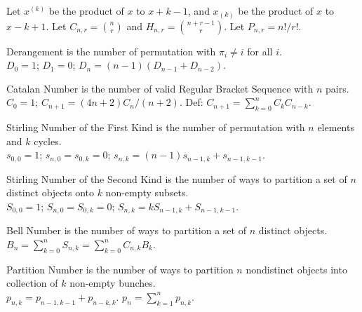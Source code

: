 Let $x^{(k)}$ be the product of $x$ to $x+k-1$, and $x_{(k)}$ be the product of $x$ to $x-k+1$.
Let $C_{n, r} = \binom{n}{r}$ and $H_{n, r} = \binom{n+r-1}{r}$. Let $P_{n, r} = n! / r!$.

Derangement is the number of permutation with $\pi_i \neq i$ for all $i$. \\
$D_0 = 1$; $D_1 = 0$; $D_n = (n-1)(D_{n-1} + D_{n-2})$.

Catalan Number is the number of valid Regular Bracket Sequence with $n$ pairs. \\
$C_0 = 1$; $C_{n+1} = (4n+2) C_n / (n+2)$. Def: $C_{n+1} = \sum_{k=0}^{n} C_k C_{n-k}$.

Stirling Number of the First Kind is the number of permutation with $n$ elements and $k$ cycles. \\
$s_{0, 0} = 1$; $s_{n, 0} = s_{0, k} = 0$; $s_{n, k} = (n-1) s_{n-1, k} + s_{n-1, k-1}$.

Stirling Number of the Second Kind is the number of ways to partition a set of $n$ distinct objects onto $k$ non-empty subsets. \\
$S_{0, 0} = 1$; $S_{n, 0} = S_{0, k} = 0$; $S_{n, k} = k S_{n-1, k} + S_{n-1, k-1}$.

Bell Number is the number of ways to partition a set of $n$ distinct objects. \\
$B_n = \sum_{k=0}^{n} S_{n, k} = \sum_{k=0}^{n} C_{n, k} B_k$.

Partition Number is the number of ways to partition $n$ nondistinct objects into collection of $k$ non-empty bunches. \\
$p_{n, k} = p_{n-1, k-1} + p_{n-k, k}$. $p_n = \sum_{k=1}^{n} p_{n, k}$.

